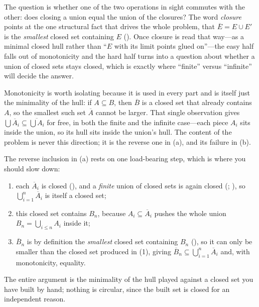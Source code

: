\documentclass[main.tex]{subfiles}
\begin{document}
\begin{Reflection}
The question is whether one of the two operations in sight commutes with the other: does closing a union
equal the union of the closures? The word \emph{closure} points at the one structural fact that drives the
whole problem, that $\overline{E}=E\cup E'$ is the \emph{smallest} closed set containing $E$ ().
Once closure is read that way---as a minimal closed hull rather than ``$E$ with its limit points glued
on''---the easy half falls out of monotonicity and the hard half turns into a question about whether a union
of closed sets stays closed, which is exactly where ``finite'' versus ``infinite'' will decide the answer.

Monotonicity is worth isolating because it is used in every part and is itself just the minimality of the
hull: if $A\subseteq B$, then $\overline B$ is a closed set that already contains $A$, so the smallest such
set $\overline A$ cannot be larger. That single observation gives $\bigcup\overline{A}_{i}\subseteq
\overline{\bigcup A_{i}}$ for free, in both the finite and the infinite case---each piece $A_{i}$ sits inside
the union, so its hull sits inside the union's hull. The content of the problem is never this direction; it
is the reverse one in (a), and its failure in (b).

The reverse inclusion in (a) rests on one load-bearing step, which is where you should slow down:
\begin{enumerate}[leftmargin=1.7em,itemsep=3pt,topsep=2pt,label=\textnormal{(\arabic*)}]
  \item each $\overline{A}_{i}$ is closed (), and a \emph{finite} union of closed sets is again
        closed (; ), so
        $\bigcup_{i=1}^{n}\overline{A}_{i}$ is itself a closed set;
  \item this closed set contains $B_{n}$, because $A_{i}\subseteq\overline{A}_{i}$ pushes the whole union
        $B_{n}=\bigcup_{i\le n}A_{i}$ inside it;
  \item $\overline{B}_{n}$ is by definition the \emph{smallest} closed set containing $B_{n}$ (),
        so it can only be smaller than the closed set produced in (1), giving
        $\overline{B}_{n}\subseteq\bigcup_{i=1}^{n}\overline{A}_{i}$ and, with monotonicity, equality.
\end{enumerate}
The entire argument is the minimality of the hull played against a closed set you have built by hand; nothing
is circular, since the built set is closed for an independent reason.


\end{Reflection}
\end{document}
